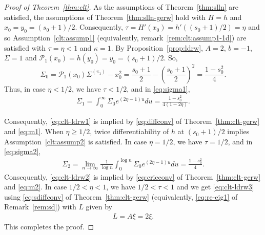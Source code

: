 \documentclass[12pt]{amsart}
\theoremstyle{plain}
\theoremstyle{remark}
\numberwithin{equation}{section}
\begin{document}
\begin{proof}[Proof of Theorem~\ref{thm:clt}] 
As the assumptions of Theorem~\ref{thm:slln} are satisfied, %
the assumptions of Theorem~\ref{thm:slln-gerw} hold with $H = h$ and $x_0 = y_0 = (s_0+1)/2$. Consequently, $\tau = H'(x_0) = h'((s_0+1)/2) = \eta$ and so Assumption~\ref{clt:assump1} (equivalently, remark~\ref{rem:clt:assump1-1d}) are satisfied with $\tau = \eta < 1$ and $\kappa = 1$. By Proposition~\ref{prop:ldrw}, $A = 2$, $b = -1$, $\Sigma = 1$ and $\mathcal{P}_1(x_0) = h(y_0) = y_0 = (s_0+1)/2$. So, 
\[{\Sigma}_0 = \mathcal{P}_1({x}_0){\Sigma}^{(\pi_1)}
   - {x}^2_0 = \frac{s_0+1}{2} -  \left(\frac{s_0+1}{2}\right)^2 = \frac{1 - s_0^2}{4}. 
\]
Thus, in case $\eta < 1/2$, we have $\tau < 1/2$, and in \eqref{eq:sigma1},
\begin{align}\label{eq:m1}
   \Sigma_1 = \int_{0}^{\infty}{\Sigma}_0e^{\left(2\eta - 1\right)u}du = \frac{1 - s_0^2}{4(1-2\eta)}.
\end{align}

Consequently, \eqref{eq:clt-ldrw1} is implied by \eqref{eq:diffconv} of Theorem~\ref{thm:clt-gerw} and \eqref{eq:m1}. When $\eta \geq 1/2$, twice differentiability of $h$ at $(s_0+1)/2$ implies Assumption~\ref{clt:assump2} is 
satisfied. In case $\eta = 1/2$, we have $\tau = 1/2$, and in \eqref{eq:sigma2},
\begin{align}\label{eq:m2}
   \Sigma_2 = \lim_{n \to \infty} \frac{1}{\log n}\int_{0}^{\log n}{\Sigma}_0e^{\left(2\eta - 1\right)u}du = \frac{1 - s_0^2}{4}.
\end{align}
Consequently, \eqref{eq:clt-ldrw2} is implied by \eqref{eq:cricconv} of Theorem~\ref{thm:clt-gerw} and \eqref{eq:m2}. In case $1/2 < \eta < 1$, we have $1/2 < \tau < 1$ and we get \eqref{eq:clt-ldrw3} using \eqref{eq:sdiffconv} of Theorem~\ref{thm:clt-gerw} (equivalently, \eqref{eq:re-eig1} of Remark~\ref{rem:sd}) with $L$ given by \begin{align}\label{eq:L}L = A{\xi} = 2\xi.\end{align} This completes the proof.
\end{proof}
\end{document}
